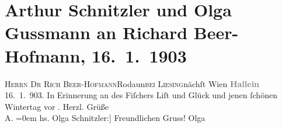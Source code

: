 

         
         \renewcommand{\erwaehntePersonen}{Personen: Richard Beer-Hofmann, Samuel Fischer}
         \renewcommand{\erwaehnteOrte}{Orte: Hallein, Rodaun, Wien, XXIII., Liesing}
         \renewcommand{\erwaehnteWerke}{}
               \section[Arthur Schnitzler und Olga Gussmann an Richard Beer-Hofmann, 16. 1. 1903]{ Arthur Schnitzler und Olga Gussmann an Richard Beer-Hofmann,
               16. 1. 1903}\nopagebreak{}\rehead{ }\begin{ledgroupsized}[t]{13cm}\normalsize\beginnumbering \toendnotes[C]{\smallbreak\pagebreak[2]} 
\toendnotes[C]{\smallbreak}\pstart{}{\pb}\textsc{Herrn Dr Rich Beer-Hofmann}\pend{}\pstart{}Rodaun\pend{}\pstart{}\textsc{bei Liesing}\pend{}\pstart{}nächſt Wien\pend{}{\bigskip}\pstart
           \noindent{}\centering{}{\pb}\textcolor{gray}{\textbf{Hallein}}\pend
           \pstart
           \raggedleft{}16. 1. 903.\pend
           \pstart
           In Erinnerung an des Fiſchers Liſt und Glück und
               jenen ſchönen Wintertag vor \label{K_L01266_1v}\label{K_L01266_1h}.\pend
           \pstart
           Herzl. Grüße{\\[\baselineskip]}\spacefill\mbox{A.}\pend
           \leftskip=0em{}\pstart
           \noindent{}{[}hs. Olga Schnitzler:{]} Freundlichen Gruss! \spacefill\mbox{Olga}\pend
           
         
         \endnumbering{}\end{ledgroupsized}  \newcommand{\dateiname}{L01266}\newcommand{\titel}{Arthur Schnitzler und Olga Gussmann an Richard Beer-Hofmann, 16. 1. 1903}\newcommand{\editorInnen}{Martin Anton Müller und Gerd-Hermann Susen}
      